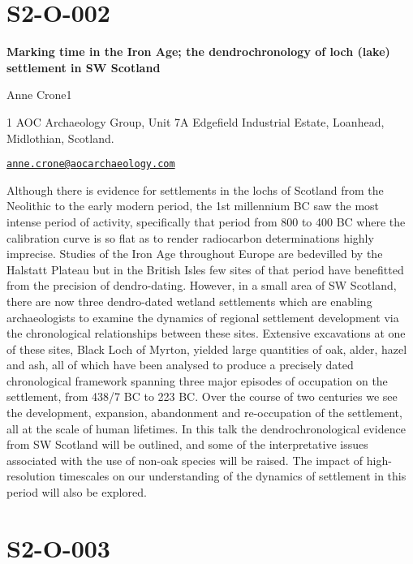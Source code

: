 \documentclass[
]{book}
\begin{document}
\hypertarget{s2-o-002}{%
\section*{S2-O-002}\label{s2-o-002}}

\textbf{Marking time in the Iron Age; the dendrochronology of loch (lake) settlement in SW Scotland}

Anne Crone1

1 AOC Archaeology Group, Unit 7A Edgefield Industrial Estate, Loanhead, Midlothian, Scotland.

\href{mailto:anne.crone@aocarchaeology.com}{\nolinkurl{anne.crone@aocarchaeology.com}}

Although there is evidence for settlements in the lochs of Scotland from the Neolithic to the early modern period, the 1st millennium BC saw the most intense period of activity, specifically that period from 800 to 400 BC where the calibration curve is so flat as to render radiocarbon determinations highly imprecise. Studies of the Iron Age throughout Europe are bedevilled by the Halstatt Plateau but in the British Isles few sites of that period have benefitted from the precision of dendro-dating. However, in a small area of SW Scotland, there are now three dendro-dated wetland settlements which are enabling archaeologists to examine the dynamics of regional settlement development via the chronological relationships between these sites. Extensive excavations at one of these sites, Black Loch of Myrton, yielded large quantities of oak, alder, hazel and ash, all of which have been analysed to produce a precisely dated chronological framework spanning three major episodes of occupation on the settlement, from 438/7 BC to 223 BC. Over the course of two centuries we see the development, expansion, abandonment and re-occupation of the settlement, all at the scale of human lifetimes. In this talk the dendrochronological evidence from SW Scotland will be outlined, and some of the interpretative issues associated with the use of non-oak species will be raised. The impact of high-resolution timescales on our understanding of the dynamics of settlement in this period will also be explored.

\hypertarget{s2-o-003}{%
\section*{S2-O-003}\label{s2-o-003}}
\end{document}
